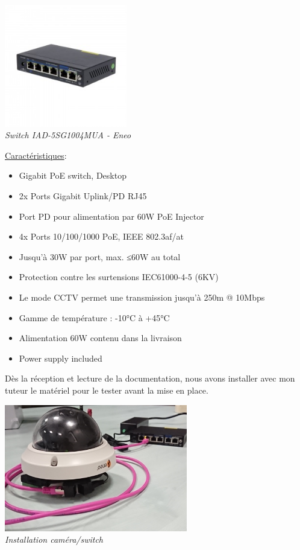 \documentclass[12pt, french]{report}
\begin{document}
\begin{center}
    \includegraphics[width=0.4\textwidth]{Dimensionnement/SWPOE.jpg}\\
    \textit{Switch IAD-5SG1004MUA - Eneo}\\
\end{center}
\underline{Caractéristiques}:
\begin{itemize}
    \item[\bullet] Gigabit PoE switch, Desktop
    \item[\bullet] 2x Ports Gigabit Uplink/PD RJ45
    \item[\bullet] Port PD pour alimentation par 60W PoE Injector
    \item[\bullet] 4x Ports 10/100/1000 PoE, IEEE 802.3af/at
    \item[\bullet] Jusqu'à 30W par port, max. ≤60W au total
    \item[\bullet] Protection contre les surtensions IEC61000-4-5 (6KV)
    \item[\bullet] Le mode CCTV permet une transmission jusqu'à 250m @ 10Mbps
    \item[\bullet] Gamme de température : -10°C à +45°C
    \item[\bullet] Alimentation 60W contenu dans la livraison
    \item[\bullet] Power supply included\\ 
\end{itemize}
Dès la réception et lecture de la documentation, nous avons installer avec mon tuteur le matériel pour le tester avant la mise en place.
\begin{center}
    \includegraphics[width=0.6\textwidth]{Dimensionnement/camsw.png}\\
    \textit{Installation caméra/switch}\\
\end{center}
\end{document}
